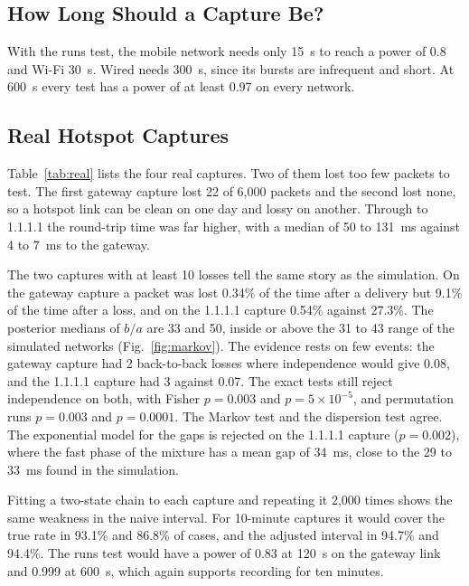 \documentclass[conference]{IEEEtran}
\begin{document}
\subsection{How Long Should a Capture Be?}
With the runs test, the mobile network needs only 15~s to reach a power of 0.8 and Wi-Fi 30~s. Wired needs 300~s, since its bursts are infrequent and short. At 600~s every test has a power of at least 0.97 on every network.

\subsection{Real Hotspot Captures}
Table~\ref{tab:real} lists the four real captures. Two of them lost too few packets to test. The first gateway capture lost 22 of 6{,}000 packets and the second lost none, so a hotspot link can be clean on one day and lossy on another. Through to 1.1.1.1 the round-trip time was far higher, with a median of 50 to 131~ms against 4 to 7~ms to the gateway.

The two captures with at least 10 losses tell the same story as the simulation. On the gateway capture a packet was lost 0.34\% of the time after a delivery but 9.1\% of the time after a loss, and on the 1.1.1.1 capture 0.54\% against 27.3\%. The posterior medians of $b/a$ are 33 and 50, inside or above the 31 to 43 range of the simulated networks (Fig.~\ref{fig:markov}). The evidence rests on few events: the gateway capture had 2 back-to-back losses where independence would give 0.08, and the 1.1.1.1 capture had 3 against 0.07. The exact tests still reject independence on both, with Fisher $p=0.003$ and $p=5\times10^{-5}$, and permutation runs $p=0.003$ and $p=0.0001$. The Markov test and the dispersion test agree. The exponential model for the gaps is rejected on the 1.1.1.1 capture ($p=0.002$), where the fast phase of the mixture has a mean gap of 34~ms, close to the 29 to 33~ms found in the simulation.

Fitting a two-state chain to each capture and repeating it 2{,}000 times shows the same weakness in the naive interval. For 10-minute captures it would cover the true rate in 93.1\% and 86.8\% of cases, and the adjusted interval in 94.7\% and 94.4\%. The runs test would have a power of 0.83 at 120~s on the gateway link and 0.999 at 600~s, which again supports recording for ten minutes.
\end{document}
